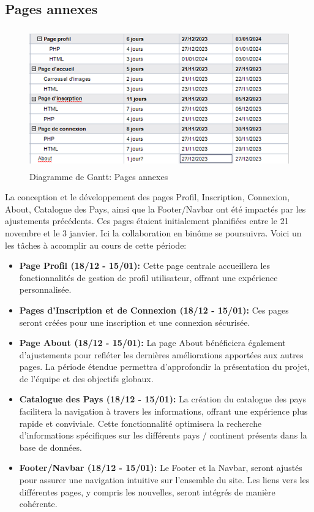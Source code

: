\documentclass[mstat,12pt]{unswthesis}
\begin{document}
\begin{adjustwidth}{-2cm}{}
\hypertarget{pages-annexes}{%
\section{Pages annexes}\label{pages-annexes}}

\begin{figure}
\centering
\includegraphics[width=12cm,height=6cm]{images/annex_gantt.png}
\caption{Diagramme de Gantt: Pages annexes}
\end{figure}

La conception et le développement des pages Profil, Inscription,
Connexion, About, Catalogue des Pays, ainsi que la Footer/Navbar ont été
impactés par les ajustements précédents. Ces pages étaient initialement
planifiées entre le 21 novembre et le 3 janvier. Ici la collaboration en
binôme se poursuivra. Voici un les tâches à accomplir au cours de cette
période:

\begin{itemize}
\tightlist
\item
  \textbf{Page Profil (18/12 - 15/01):} Cette page centrale accueillera
  les fonctionnalités de gestion de profil utilisateur, offrant une
  expérience personnalisée.
\item
  \textbf{Pages d'Inscription et de Connexion (18/12 - 15/01):} Ces
  pages seront créées pour une inscription et une connexion sécurisée.
\item
  \textbf{Page About (18/12 - 15/01):} La page About bénéficiera
  également d'ajustements pour refléter les dernières améliorations
  apportées aux autres pages. La période étendue permettra d'approfondir
  la présentation du projet, de l'équipe et des objectifs globaux.
\item
  \textbf{Catalogue des Pays (18/12 - 15/01):} La création du catalogue
  des pays facilitera la navigation à travers les informations, offrant
  une expérience plus rapide et conviviale. Cette fonctionnalité
  optimisera la recherche d'informations spécifiques sur les différents
  pays / continent présents dans la base de données.
\item
  \textbf{Footer/Navbar (18/12 - 15/01):} Le Footer et la Navbar, seront
  ajustés pour assurer une navigation intuitive sur l'ensemble du site.
  Les liens vers les différentes pages, y compris les nouvelles, seront
  intégrés de manière cohérente.
\end{itemize}


\end{adjustwidth}
\end{document}
